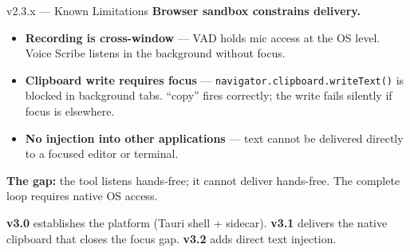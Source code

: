 \documentclass{beamer}
\begin{document}
\begin{frame}{v2.3.x --- Known Limitations}
    \small
    \textbf{Browser sandbox constrains delivery.}

    \vspace{0.3em}
    \begin{itemize}\setlength{\itemsep}{3pt}
        \item \textbf{Recording is cross-window} --- VAD holds mic access at the OS
              level. Voice Scribe listens in the background without focus.
        \item \textbf{Clipboard write requires focus} ---
              \texttt{navigator.clipboard.writeText()} is blocked in background tabs.
              ``copy'' fires correctly; the write fails silently if focus is elsewhere.
        \item \textbf{No injection into other applications} --- text cannot be
              delivered directly to a focused editor or terminal.
    \end{itemize}

    \vspace{0.3em}
    \textbf{The gap:} the tool listens hands-free; it cannot deliver hands-free.
    The complete loop requires native OS access.

    \vspace{0.2em}
    {\footnotesize\textbf{v3.0} establishes the platform (Tauri shell + sidecar).
    \textbf{v3.1} delivers the native clipboard that closes the focus gap.
    \textbf{v3.2} adds direct text injection.}
\end{frame}
\end{document}
